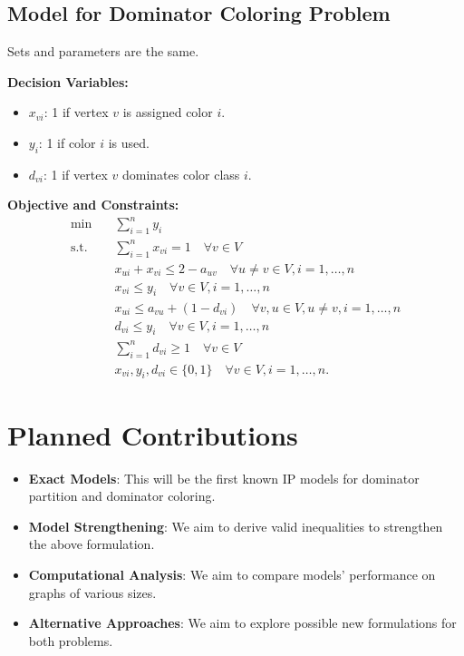 \documentclass[12pt]{article}
\begin{document}
\subsection{Model for Dominator Coloring Problem}
Sets and parameters are the same.

\textbf{Decision Variables:}
\begin{itemize}[label=, noitemsep]
    \item $x_{vi}$: 1 if vertex $v$ is assigned color $i$.
    \item $y_i$: 1 if color $i$ is used.
    \item $d_{vi}$: 1 if vertex $v$ dominates color class $i$.
\end{itemize}

\textbf{Objective and Constraints:}
\begin{align*}
    \min \quad & \sum_{i=1}^{n} y_i \\
    \text{s.t.} \quad
    & \sum_{i=1}^{n} x_{vi} = 1 \quad \forall v \in V \\
    & x_{ui} + x_{vi} \leq 2 - a_{uv} \quad \forall u \neq v \in V, i=1,\dots,n \\
    & x_{vi} \leq y_i \quad \forall v \in V, i=1,\dots,n \\
    & x_{ui} \leq a_{vu} + (1 - d_{vi}) \quad \forall v, u \in V, u \neq v, i=1,\dots,n \\
    & d_{vi} \leq y_i \quad \forall v \in V, i=1,\dots,n \\
    & \sum_{i=1}^{n} d_{vi} \geq 1 \quad \forall v \in V \\
    & x_{vi}, y_i, d_{vi} \in \{0,1\} \quad \forall v \in V, i=1,\dots,n.
\end{align*}

\section{Planned Contributions}
\begin{itemize}[leftmargin=*, noitemsep]
    \item \textbf{Exact Models}: This will be the first known IP models for dominator partition and dominator coloring.
    \item \textbf{Model Strengthening}: We aim to derive valid inequalities to strengthen the above formulation.
    \item \textbf{Computational Analysis}: We aim to compare models' performance on graphs of various sizes.
    \item \textbf{Alternative Approaches}: We aim to explore possible new formulations for both problems.
\end{itemize}
\end{document}

